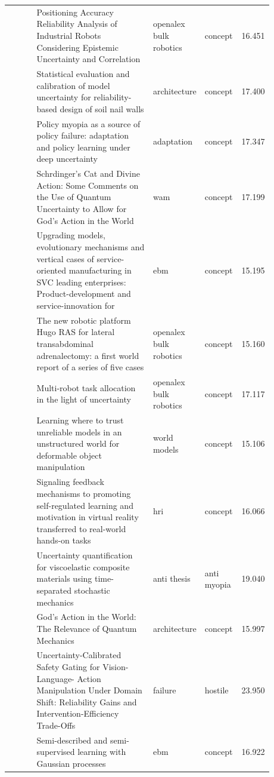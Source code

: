 \documentclass{article}
\begin{document}
\begin{center}
\begin{longtable}{p{0.12\linewidth}p{0.48\linewidth}p{0.14\linewidth}p{0.14\linewidth}r}
\citep{pool88_39} & Positioning Accuracy Reliability Analysis of Industrial Robots Considering Epistemic Uncertainty and Correlation & openalex bulk robotics & concept & 16.451\\
\citep{pool88_40} & Statistical evaluation and calibration of model uncertainty for reliability-based design of soil nail walls & architecture & concept & 17.400\\
\citep{pool88_41} & Policy myopia as a source of policy failure: adaptation and policy learning under deep uncertainty & adaptation & concept & 17.347\\
\citep{pool88_42} & Schrdinger's Cat and Divine Action: Some Comments on the Use of Quantum Uncertainty to Allow for God's Action in the World & wam & concept & 17.199\\
\citep{pool88_43} & Upgrading models, evolutionary mechanisms and vertical cases of service-oriented manufacturing in SVC leading enterprises: Product-development and service-innovation for  & ebm & concept & 15.195\\
\citep{pool88_44} & The new robotic platform Hugo RAS for lateral transabdominal adrenalectomy: a first world report of a series of five cases & openalex bulk robotics & concept & 15.160\\
\citep{pool88_45} & Multi-robot task allocation in the light of uncertainty & openalex bulk robotics & concept & 17.117\\
\citep{pool88_46} & Learning where to trust unreliable models in an unstructured world for deformable object manipulation & world models & concept & 15.106\\
\citep{pool88_47} & Signaling feedback mechanisms to promoting self-regulated learning and motivation in virtual reality transferred to real-world hands-on tasks & hri & concept & 16.066\\
\citep{pool88_48} & Uncertainty quantification for viscoelastic composite materials using time-separated stochastic mechanics & anti thesis & anti myopia & 19.040\\
\citep{pool88_49} & God's Action in the World: The Relevance of Quantum Mechanics & architecture & concept & 15.997\\
\citep{pool88_50} & Uncertainty-Calibrated Safety Gating for Vision-Language- Action Manipulation Under Domain Shift: Reliability Gains and Intervention-Efficiency Trade-Offs & failure & hostile & 23.950\\
\citep{pool88_51} & Semi-described and semi-supervised learning with Gaussian processes & ebm & concept & 16.922\\

\end{longtable}
\end{center}
\end{document}
